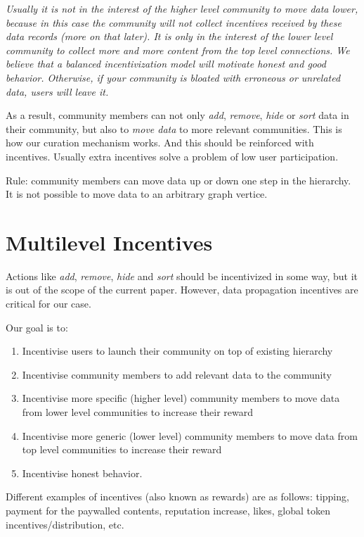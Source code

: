 \documentclass[10pt,a4paper]{article}
\begin{document}
{\it 
Usually it is not in the interest of the higher level community to move data lower, because in this case the community will not collect incentives received by these data records (more on that later). It is only in the interest of the lower level community to collect more and more content from the top level connections. We believe that a balanced incentivization model will motivate honest and good behavior. Otherwise, if your community is bloated with erroneous or unrelated data, users will leave it.
}\newline

As a result, community members can not only {\it add}, {\it remove}, {\it hide} or {\it sort} data in their community, but also to {\it move data} to more relevant communities. This is how our curation mechanism works. And this should be reinforced with incentives. Usually extra incentives solve a problem of low user participation.\newline

Rule: community members can move data up or down one step in the hierarchy. It is not possible to move data to an arbitrary graph vertice.


\section{Multilevel Incentives}

Actions like {\it add}, {\it remove}, {\it hide} and {\it sort} should be incentivized in some way, but it is out of the scope of the current paper. However, data propagation incentives are critical for our case.

Our goal is to:

\begin{enumerate}
    \item Incentivise users to launch their community on top of existing hierarchy
    \item Incentivise community members to add relevant data to the community
    \item Incentivise more specific (higher level) community members to move data from lower level communities to increase their reward
    \item Incentivise more generic (lower level) community members to move data from top level communities to increase their reward
    \item Incentivise honest behavior.
\end{enumerate}

Different examples of incentives (also known as rewards) are as follows: tipping, payment for the paywalled contents, reputation increase, likes, global token incentives/distribution, etc.\newline
\end{document}
